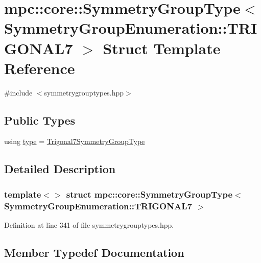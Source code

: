 \hypertarget{structmpc_1_1core_1_1_symmetry_group_type_3_01_symmetry_group_enumeration_1_1_t_r_i_g_o_n_a_l7_01_4}{}\section{mpc\+:\+:core\+:\+:Symmetry\+Group\+Type$<$ Symmetry\+Group\+Enumeration\+:\+:T\+R\+I\+G\+O\+N\+A\+L7 $>$ Struct Template Reference}
\label{structmpc_1_1core_1_1_symmetry_group_type_3_01_symmetry_group_enumeration_1_1_t_r_i_g_o_n_a_l7_01_4}


{\ttfamily \#include $<$symmetrygrouptypes.\+hpp$>$}

\subsection*{Public Types}
\begin{DoxyCompactItemize}
\item 
using \mbox{\hyperlink{structmpc_1_1core_1_1_symmetry_group_type_3_01_symmetry_group_enumeration_1_1_t_r_i_g_o_n_a_l7_01_4_a19c2ab6d3c1bdfcc28a69e76453e54cf}{type}} = \mbox{\hyperlink{structmpc_1_1core_1_1_trigonal7_symmetry_group_type}{Trigonal7\+Symmetry\+Group\+Type}}
\end{DoxyCompactItemize}


\subsection{Detailed Description}
\subsubsection*{template$<$$>$\newline
struct mpc\+::core\+::\+Symmetry\+Group\+Type$<$ Symmetry\+Group\+Enumeration\+::\+T\+R\+I\+G\+O\+N\+A\+L7 $>$}



Definition at line 341 of file symmetrygrouptypes.\+hpp.



\subsection{Member Typedef Documentation}
\mbox{\label{structmpc_1_1core_1_1_symmetry_group_type_3_01_symmetry_group_enumeration_1_1_t_r_i_g_o_n_a_l7_01_4_a19c2ab6d3c1bdfcc28a69e76453e54cf}} 
